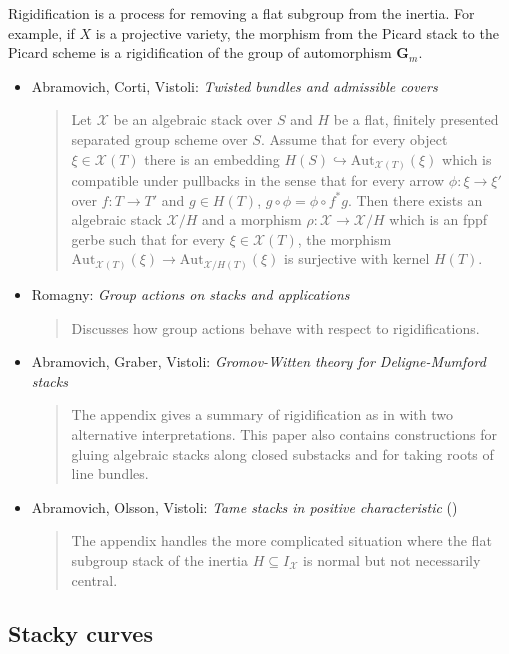 \noindent
Rigidification is a process for removing a flat subgroup from the inertia.
For example, if $X$ is a projective variety, the morphism from the Picard
stack to the Picard scheme is a rigidification of the group of automorphism
$\mathbf{G}_m$.
\begin{itemize}
\item Abramovich, Corti, Vistoli:
\emph{Twisted bundles and admissible covers} \cite{acv}
\begin{quote}
Let $\mathcal{X}$ be an algebraic stack over $S$ and $H$ be a flat, finitely
presented separated group scheme over $S$. Assume that for every object
$\xi \in \mathcal{X}(T)$ there is an embedding
$H(S) \hookrightarrow \text{Aut}_{\mathcal{X}(T)}(\xi)$ which is compatible
under pullbacks in the sense that for every arrow $\phi: \xi \rightarrow \xi'$
over $f: T \rightarrow T'$ and $g \in H(T)$, $g \circ \phi = \phi \circ f^*g$.
Then there exists an algebraic stack $\mathcal{X}/H$ and a
morphism $\rho: \mathcal{X} \rightarrow \mathcal{X}/H$ which is
an fppf gerbe such that for every $\xi \in \mathcal{X}(T)$, the morphism
$\text{Aut}_{\mathcal{X}(T)} (\xi)
\rightarrow \text{Aut}_{\mathcal{X}/H (T)} (\xi) $
is surjective with kernel $H(T)$.
\end{quote}
\item Romagny: \emph{Group actions on stacks and applications}
\cite{romagny_actions}
\begin{quote}
Discusses how group actions behave with respect to rigidifications.
\end{quote}
\item Abramovich, Graber, Vistoli:
\emph{Gromov-Witten theory for Deligne-Mumford stacks} \cite{agv}
\begin{quote}
The appendix gives a summary of rigidification as in \cite{acv} with two
alternative interpretations. This paper also contains constructions for
gluing algebraic stacks along closed substacks and for taking roots of line
bundles.
\end{quote}
\item
Abramovich, Olsson, Vistoli: \emph{Tame stacks in positive characteristic}
(\cite{tame})
\begin{quote}
The appendix handles the more complicated situation where the flat subgroup
stack of the inertia $H \subseteq I_\mathcal{X}$ is normal but not
necessarily central.
\end{quote}
\end{itemize}

\subsection{Stacky curves}
\label{subsection-stacky-curves}

